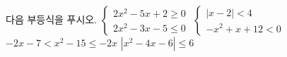 다음 부등식을 푸시오.
 $\begin{cases} 2x^2-5x+2\ge 0 \\ 2x^2-3x-5\le 0 \end{cases}$
 $\begin{cases} |x-2|<4 \\ -x^2+x+12<0 \end{cases}$
 $-2x-7<x^2-15\le -2x$
 $|x^2-4x-6|\le 6$

